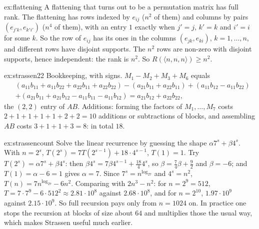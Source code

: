 \begin{solution}{ex:flattening}
\idea A flattening that turns out to be a permutation matrix has full rank.
\writeup The flattening has rows indexed by $e_{ij}$ ($n^2$ of them) and columns by pairs $(e_{j'k},e_{k'i'})$ ($n^4$ of them), with an
entry $1$ exactly when $j'=j$, $k'=k$ and $i'=i$ for some $k$. So the row of $e_{ij}$ has its ones in the columns $(e_{jk},e_{ki})$,
$k=1,\dots,n$, and different rows have disjoint supports. The $n^2$ rows are non-zero with disjoint supports, hence independent:
the rank is $n^2$. So $R(\langle n,n,n\rangle)\ge n^2$.
\end{solution}

\begin{solution}{ex:strassen22}
\idea Bookkeeping, with signs.
\writeup $M_1-M_2+M_3+M_6$ equals
\[
\begin{aligned}
&(a_{11}b_{11}+a_{11}b_{22}+a_{22}b_{11}+a_{22}b_{22})-(a_{21}b_{11}+a_{22}b_{11})+(a_{11}b_{12}-a_{11}b_{22})\\
&+(a_{21}b_{11}+a_{21}b_{12}-a_{11}b_{11}-a_{11}b_{12})=a_{21}b_{12}+a_{22}b_{22},
\end{aligned}
\]
the $(2,2)$ entry of $AB$. Additions: forming the factors of $M_1,\dots,M_7$ costs $2+1+1+1+1+2+2=10$ additions or subtractions of
blocks, and assembling $AB$ costs $3+1+1+3=8$: in total $18$.
\end{solution}

\begin{solution}{ex:strassencount}
\idea Solve the linear recurrence by guessing the shape $\alpha7^s+\beta4^s$.
\writeup With $n=2^s$, $T(2^s)=7T(2^{s-1})+18\cdot4^{s-1}$, $T(1)=1$. Try $T(2^s)=\alpha7^s+\beta4^s$: then $\beta4^s=7\beta4^{s-1}+
\frac{18}44^s$, so $\beta=\frac74\beta+\frac92$ and $\beta=-6$; and $T(1)=\alpha-6=1$ gives $\alpha=7$. Since $7^s=n^{\log_27}$ and $4^s=n^2$,
$T(n)=7n^{\log_27}-6n^2$. Comparing with $2n^3-n^2$: for $n=2^9=512$, $T=7\cdot7^9-6\cdot512^2\approx2.81\cdot10^8$ against $2.68\cdot10^8$,
and for $n=2^{10}$, $1.97\cdot10^9$ against $2.15\cdot10^9$. So full recursion pays only from $n=1024$ on. In practice one stops the
recursion at blocks of size about $64$ and multiplies those the usual way, which makes Strassen useful much earlier.
\end{solution}

